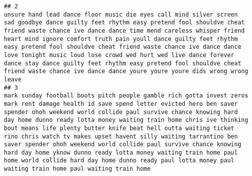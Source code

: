 \documentclass[]{article}
\begin{document}
\begin{verbatim}
## 2                                                                                                                                                                                                                                                                                                                                                                                                                                                                                                                                                                                                                                                            unsure hand lead dance floor music die eyes call mind silver screen sad goodbye dance guilty feet rhythm easy pretend fool shouldve cheat friend waste chance ive dance dance time mend careless whisper friend heart mind ignore comfort truth pain youll dance guilty feet rhythm easy pretend fool shouldve cheat friend waste chance ive dance dance love tonight music loud lose crowd wed hurt wed live dance forever dance stay dance guilty feet rhythm easy pretend fool shouldve cheat friend waste chance ive dance dance youre youre youre dids wrong wrong leave
## 3                                                                                                                                                                                                                                                                                                                                                                                                                                                                                                                                                      mark sunday football boots pitch people gamble rich gotta invest zeros mark rent damage health id save spend letter evicted hero ben saver spender ohoh weekend world collide paul survive chance knowing hard day home dunno ready lotta money waiting train home chris ive thinking bout means life plenty butter knife beat hell outta waiting ticket rino chris watch tv makes upset havent silly waiting tarrantino ben saver spender ohoh weekend world collide paul survive chance knowing hard day home yknow dunno ready lotta money waiting train home paul home world collide hard day home dunno ready paul lotta money paul waiting train home paul waiting train home

\end{verbatim}
\end{document}
